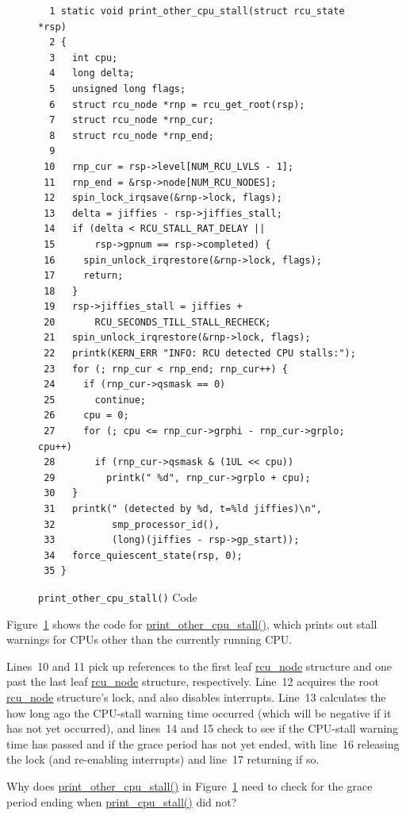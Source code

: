 \begin{figure}[tbp]
{ \scriptsize
\begin{verbatim}
  1 static void print_other_cpu_stall(struct rcu_state *rsp)
  2 {
  3   int cpu;
  4   long delta;
  5   unsigned long flags;
  6   struct rcu_node *rnp = rcu_get_root(rsp);
  7   struct rcu_node *rnp_cur;
  8   struct rcu_node *rnp_end;
  9
 10   rnp_cur = rsp->level[NUM_RCU_LVLS - 1];
 11   rnp_end = &rsp->node[NUM_RCU_NODES];
 12   spin_lock_irqsave(&rnp->lock, flags);
 13   delta = jiffies - rsp->jiffies_stall;
 14   if (delta < RCU_STALL_RAT_DELAY ||
 15       rsp->gpnum == rsp->completed) {
 16     spin_unlock_irqrestore(&rnp->lock, flags);
 17     return;
 18   }
 19   rsp->jiffies_stall = jiffies +
 20       RCU_SECONDS_TILL_STALL_RECHECK;
 21   spin_unlock_irqrestore(&rnp->lock, flags);
 22   printk(KERN_ERR "INFO: RCU detected CPU stalls:");
 23   for (; rnp_cur < rnp_end; rnp_cur++) {
 24     if (rnp_cur->qsmask == 0)
 25       continue;
 26     cpu = 0;
 27     for (; cpu <= rnp_cur->grphi - rnp_cur->grplo; cpu++)
 28       if (rnp_cur->qsmask & (1UL << cpu))
 29         printk(" %d", rnp_cur->grplo + cpu);
 30   }
 31   printk(" (detected by %d, t=%ld jiffies)\n",
 32          smp_processor_id(),
 33          (long)(jiffies - rsp->gp_start));
 34   force_quiescent_state(rsp, 0);
 35 }
\end{verbatim}
}
\caption{{\tt print\_other\_cpu\_stall()} Code}
\label{fig:app:rcuimpl:rcutreewt:Code for print-other-cpu-stall}
\end{figure}

Figure~\ref{fig:app:rcuimpl:rcutreewt:Code for print-other-cpu-stall}
shows the code for \url{print_other_cpu_stall()}, which prints out
stall warnings for CPUs other than the currently running CPU.

Lines~10 and 11 pick up references to the first leaf \url{rcu_node}
structure and one past the last leaf \url{rcu_node} structure,
respectively.
Line~12 acquires the root \url{rcu_node} structure's lock, and also
disables interrupts.
Line~13 calculates the how long ago the CPU-stall warning time occurred
(which will be negative if it has not yet occurred), and lines~14 and 15
check to see if the CPU-stall warning time has passed and if the
grace period has not yet ended,
with line~16 releasing the lock (and re-enabling interrupts) and
line~17 returning if so.

\QuickQuiz{}
	Why does \url{print_other_cpu_stall()} in
	Figure~\ref{fig:app:rcuimpl:rcutreewt:Code for print-other-cpu-stall}
	need to check for the grace period ending when
	\url{print_cpu_stall()} did not?
 \QuickQuizEnd

